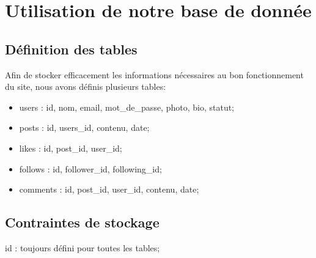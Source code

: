 \documentclass[12pt,a4paper]{article}
\begin{document}
\section{Utilisation de notre base de donnée}
\subsection{Définition des tables}
  Afin de stocker efficacement les informations nécessaires au bon fonctionnement du site, nous avons définis plusieurs tables:
  
 \begin{itemize}
 \item users : id, nom, email, mot\_de\_passe, photo, bio, statut;
 \item posts : id, users\_id, contenu, date;
 \item likes : id, post\_id, user\_id;
 \item follows : id, follower\_id, following\_id;
 \item comments : id, post\_id, user\_id, contenu, date;
 \end{itemize}

\newpage

\subsection{Contraintes de stockage}

id : toujours défini pour toutes les tables;
\end{document}
